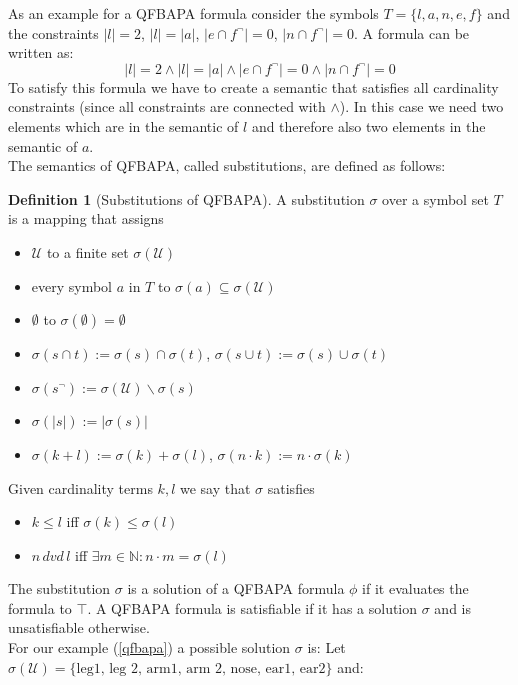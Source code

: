 \documentclass{book}
\theoremstyle{break}
\theoremstyle{definition}
\newtheorem{mydef}{Definition}
\begin{document}
As an example for a QFBAPA formula consider the symbols $T=\{l, a, n, e, f\}$ and the constraints $|l|=2$, $|l|=|a|$, $|e\cap f^\neg|=0$, $|n\cap f^\neg|=0$. A formula can be written as: 
\begin{equation}\label{qfbapa}
|l|=2\wedge|l|=|a|\wedge |e\cap f^\neg|=0\wedge |n\cap f^\neg|=0
\end{equation}
To satisfy this formula we have to create a semantic that satisfies all cardinality constraints (since all constraints are connected with $\wedge$). In this case we need two elements which are in the semantic of $l$ and therefore also two elements in the semantic of $a$.\\
The semantics of QFBAPA, called substitutions, are defined as follows:
\begin{mydef}[Substitutions of QFBAPA]
A substitution $\sigma$ over a symbol set $T$ is a mapping that assigns
\begin{itemize}
\item $\mathcal{U}$ to a finite set $\sigma(\mathcal{U})$
\item every symbol $a$ in $T$ to $\sigma(a)\subseteq\sigma(\mathcal{U})$
\item $\emptyset$ to $\sigma(\emptyset)=\emptyset$
\item $\sigma(s\cap t):= \sigma(s)\cap \sigma(t)$, $\sigma(s\cup t):= \sigma(s)\cup \sigma(t)$
\item $\sigma(s^\neg):=\sigma(\mathcal{U})\backslash \sigma(s)$
\item $\sigma(|s|):=|\sigma(s)|$
\item $\sigma(k+l):=\sigma(k)+\sigma(l)$, $\sigma(n\cdot k):= n\cdot \sigma(k)$
\end{itemize}
Given cardinality terms $k,l$ we say that $\sigma$ satisfies
\begin{itemize}
\item $k\leq l$ iff $\sigma(k)\leq \sigma(l)$
\item $n\,dvd\,l$ iff $\exists m\in\mathbb{N}:n\cdot m = \sigma(l)$
\end{itemize}
\end{mydef}
The substitution $\sigma$ is a solution of a QFBAPA formula $\phi$ if it evaluates the formula to $\top$. A QFBAPA formula is satisfiable if it has a solution $\sigma$ and is unsatisfiable otherwise.\\
For our example (\ref{qfbapa}) a possible solution $\sigma$ is: Let $\sigma(\mathcal{U})=\{\text{leg1, leg 2, arm1, arm 2, nose, ear1, ear2}\}$ and:
\end{document}
